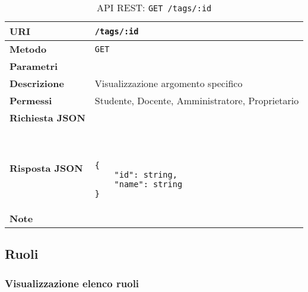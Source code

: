         \begin{table}[H]
            \begin{center}
                \begin{tabular}{p{} p{}}
                    \toprule
                    \textbf{URI} & \texttt{/tags/:id} \\ \midrule
                    \textbf{Metodo} & \texttt{GET} \\ \midrule
                    \textbf{Parametri} & \\ \midrule
                    \textbf{Descrizione} & Visualizzazione argomento specifico \\ \midrule
                    \textbf{Permessi} & Studente, Docente, Amministratore, Proprietario  \\ \midrule
                    \textbf{Richiesta JSON} & \\ \midrule
                    \textbf{Risposta JSON} & \
                        \begin{lstlisting}[basicstyle={\ttfamily}]
{
    "id": string,
    "name": string
}
                        \end{lstlisting}
                        \\ \midrule
                    \textbf{Note} & \\
                    \bottomrule
                \end{tabular}
                \caption{API REST: \texttt{GET /tags/:id}}
            \end{center}
        \end{table}


\subsection{Ruoli}

    \subsubsection{Visualizzazione elenco ruoli}

